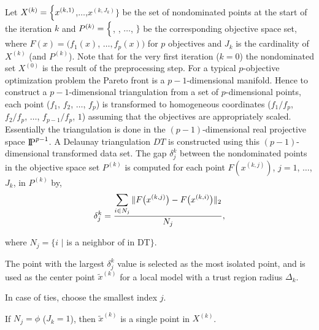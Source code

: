 \smallskip

\noindent Let $X^{(k)} = \Bigl\{x^{(k,1)}$,$\ldots$,$x^{(k,J_k)}\Bigr\}$ be the
set of nondominated points at the start of the iteration $k$ and $P^{(k)} =
\Bigl\{$, , $\ldots$, $\Bigr\}$ be the corresponding
objective space set, where $F(x) = \bigl (f_1(x)$, $\ldots, f_p(x)\bigr )$ for
$p$ objectives and $J_{k}$ is the cardinality of $X^{(k)}$ (and $P^{(k)}$).
Note that for the very first iteration ($k=0$) the nondominated set $X^{(0)}$
is the result of the preprocessing step. For a typical $p$-objective
optimization problem the Pareto front is a $p-1$-dimensional manifold. Hence to
construct a $p-1$-dimensional triangulation from a set of $p$-dimensional
points,  each point ($f_1$, $f_2$, $\ldots$, $f_p$) is transformed to
homogeneous coordinates ($f_1/f_p$, $f_2/f_p$, $\ldots$, ${f_{p-1}}/f_p$, $1$)
assuming that the objectives are appropriately scaled. Essentially the
triangulation is done in the $(p-1)$-dimensional real projective space
$\P^{p-1}$. A Delaunay triangulation $DT$ is constructed using this 
$(p-1)$-dimensional transformed data set. The gap $\delta_j^k$ between the
nondominated points in the objective space set $P^{(k)}$ is computed for each
point $F(x^{(k,j)})$, $j=1$, $\ldots$, $J_k$, in $P^{(k)}$ by,
$$\delta_j^k={\displaystyle {\sum_{i\in N_j}
{\|F\bigl(x^{(k,j)}\bigr)-F\bigl(x^{(k,i)}\bigr)\|_2}}\over {N_j}},$$

where $N_j=\bigl\{ i$ $\mid$   is a neighbor of  in DT$\bigr\}$.

\par\noindent The point  with the largest $\delta_j^k$ value is selected
as the most isolated point, and is used as the center point ${\tilde x} ^{(k)}$
for a local model with a trust region radius $\Delta_k$. 

\par\noindent In case of ties, choose the smallest index $j$. 

\par\noindent If $N_j=\phi$ ($J_k=1$), then ${\tilde x} ^{(k)}$ is a single
point in $X^{(k)}$.  

